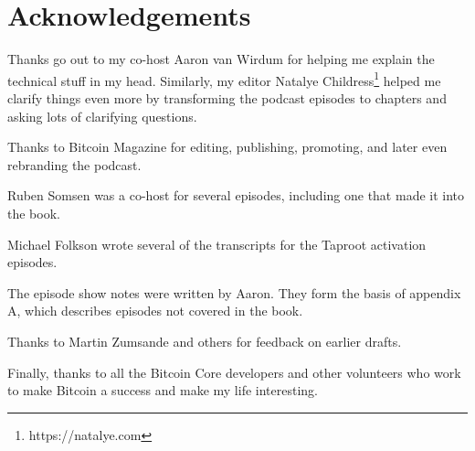 \pagestyle{myheadings}
\chapter{Acknowledgements}

Thanks go out to my co-host Aaron van Wirdum for helping me explain the technical stuff in my head. Similarly, my editor Natalye Childress\footnote{https://natalye.com  } helped me clarify things even more by transforming the podcast episodes to chapters and asking lots of clarifying questions.

Thanks to Bitcoin Magazine for editing, publishing, promoting, and later even rebranding the podcast.

Ruben Somsen was a co-host for several episodes, including one that made it into the book.

Michael Folkson wrote several of the transcripts for the Taproot activation episodes.

The episode show notes were written by Aaron. They form the basis of appendix A, which describes episodes not covered in the book.

Thanks to Martin Zumsande and others for feedback on earlier drafts.

Finally, thanks to all the Bitcoin Core developers and other volunteers who work to make Bitcoin a success and make my life interesting.

\newpage
